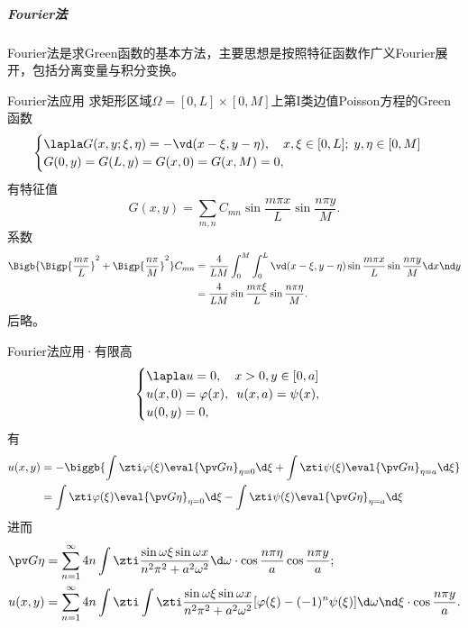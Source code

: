 \subparagraph*{Fourier法}
Fourier法是求Green函数的基本方法，主要思想是按照特征函数作广义Fourier展开，包括分离变量与积分变换。
\begin{example}{Fourier法应用}{}	
	求矩形区域$\Omega=[0,L]\times[0,M]$上第I类边值Poisson方程的Green函数
	\begin{align*}
		\begin{cases}
			\lapla G(x,y;\xi,\eta)=-\vd(x-\xi,y-\eta),\quad x,\xi\in[0,L];\;y,\eta\in[0,M]\\
			G(0,y)=G(L,y)=G(x,0)=G(x,M)=0,
		\end{cases}
	\end{align*}
	有特征值 
	\[
		G(x,y)=\sum_{m,n}C_{mn}\sin\frac{m\pi x}L\sin\frac{n\pi y}M.
	\]
	系数 
	{\footnotesize
	\begin{align*}
		\Bigb{\Bigp{\frac{m\pi}L}^2+\Bigp{\frac{n\pi}M}^2}C_{mn}&=\frac4{LM}\int_0^M\int_0^L\vd(x-\xi,y-\eta)\sin\frac{m\pi x}L\sin\frac{n\pi y}M\d x\nd y\\
		&=\frac4{LM}\sin\frac{m\pi\xi}L\sin\frac{n\pi\eta}M.
	\end{align*}}
	后略。
\end{example}
\begin{example}{Fourier法应用·有限高}{}
	\begin{equation*}
		\begin{cases}
			\lapla u=0,\quad x>0,y\in[0,a]\\
			u(x,0)=\varphi(x),\enspace u(x,a)=\psi(x),\\
			u(0,y)=0,
		\end{cases}
	\end{equation*}
	有
	\begin{align*}
		u(x,y)&=-\biggb{\int\zti\varphi(\xi)\eval{\pv Gn}_{\eta=0}\d\xi+\int\zti\psi(\xi)\eval{\pv Gn}_{\eta=a}\d\xi}\\
		&=\int\zti\varphi(\xi)\eval{\pv G\eta}_{\eta=0}\d\xi-\int\zti\psi(\xi)\eval{\pv G\eta}_{\eta=a}\d\xi
	\end{align*}
	进而
	\begin{align*}
		\pv G\eta&=\sum_{n=1}^\infty4n\int\zti\frac{\sin\omega\xi\sin\omega x}{n^2\pi^2+a^2\omega^2}\d\omega\cdot\cos\frac{n\pi\eta}a\cos\frac{n\pi y}a;\\
		u(x,y)&=\sum_{n=1}^\infty4n\int\zti\int\zti\frac{\sin\omega\xi\sin\omega x}{n^2\pi^2+a^2\omega^2}[\varphi(\xi)-(-1)^n\psi(\xi)]\d\omega\nd\xi\cdot\cos\frac{n\pi y}a.
	\end{align*}
\end{example}

